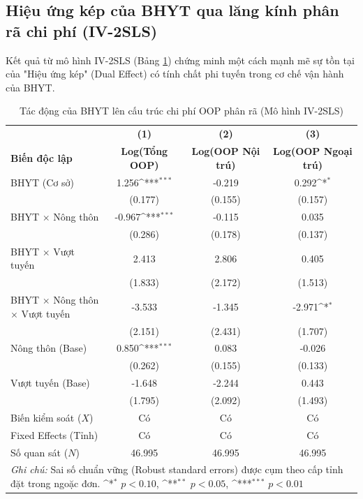 \documentclass[12pt,a4paper]{article}
\begin{document}
\newpage
\subsection{Hiệu ứng kép của BHYT qua lăng kính phân rã chi phí (IV-2SLS)}

Kết quả từ mô hình IV-2SLS (Bảng \ref{tab:decomposed_oop}) chứng minh một cách mạnh mẽ sự tồn tại của "Hiệu ứng kép" (Dual Effect) có tính chất phi tuyến trong cơ chế vận hành của BHYT.

\begin{table}[htbp]
	\centering
	\def\sym#1{\ifmmode^{#1}\else\(^{#1}\)\fi}
	\caption{Tác động của BHYT lên cấu trúc chi phí OOP phân rã (Mô hình IV-2SLS)}
	\label{tab:decomposed_oop}
	\begin{tabular}{lccc}
		\toprule
		&\textbf{(1)}&\textbf{(2)}&\textbf{(3)}\\
		\textbf{Biến độc lập}&\textbf{Log(Tổng OOP)}&\textbf{Log(OOP Nội trú)}&\textbf{Log(OOP Ngoại trú)}\\
		\midrule
		BHYT (Cơ sở) & 1.256\sym{***} & -0.219 & 0.292\sym{*} \\
		& (0.177) & (0.155) & (0.157) \\
		\addlinespace
		BHYT $\times$ Nông thôn & -0.967\sym{***} & -0.115 & 0.035 \\
		& (0.286) & (0.178) & (0.137) \\
		\addlinespace
		BHYT $\times$ Vượt tuyến & 2.413 & 2.806 & 0.405 \\
		& (1.833) & (2.172) & (1.513) \\
		\addlinespace
		BHYT $\times$ Nông thôn $\times$ Vượt tuyến & -3.533 & -1.345 & -2.971\sym{*} \\
		& (2.151) & (2.431) & (1.707) \\
		\addlinespace
		Nông thôn (Base) & 0.850\sym{***} & 0.083 & -0.026 \\
		& (0.262) & (0.155) & (0.133) \\
		\addlinespace
		Vượt tuyến (Base) & -1.648 & -2.244 & 0.443 \\
		& (1.795) & (2.092) & (1.493) \\
		\midrule
		Biến kiểm soát ($X$) & Có & Có & Có \\
		Fixed Effects (Tỉnh) & Có & Có & Có \\
		\midrule
		Số quan sát ($N$) & 46.995 & 46.995 & 46.995 \\
		\bottomrule
		\multicolumn{4}{p{13cm}}{\footnotesize \textit{Ghi chú:} Sai số chuẩn vững (Robust standard errors) được cụm theo cấp tỉnh đặt trong ngoặc đơn. \newline \sym{*} \(p<0.10\), \sym{**} \(p<0.05\), \sym{***} \(p<0.01\)}
	\end{tabular}
\end{table}
\end{document}
